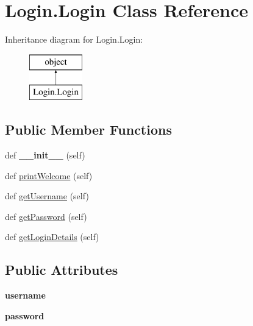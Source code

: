 \hypertarget{class_login_1_1_login}{}\section{Login.\+Login Class Reference}
\label{class_login_1_1_login}
Inheritance diagram for Login.\+Login\+:\begin{figure}[H]
\begin{center}
\leavevmode
\includegraphics[height=2.000000cm]{class_login_1_1_login}
\end{center}
\end{figure}
\subsection*{Public Member Functions}
\begin{DoxyCompactItemize}
\item 
\hypertarget{class_login_1_1_login_a74dca9aa3c7fc04833737bed7ba4f48d}{}\label{class_login_1_1_login_a74dca9aa3c7fc04833737bed7ba4f48d} 
def {\bfseries \+\_\+\+\_\+init\+\_\+\+\_\+} (self)
\item 
def \hyperlink{class_login_1_1_login_a77f5c43218a5b49e663f72e02324b8ef}{print\+Welcome} (self)
\item 
def \hyperlink{class_login_1_1_login_a21cb771ec1b1d2d7aa17ca541465200b}{get\+Username} (self)
\item 
def \hyperlink{class_login_1_1_login_a61681c3cd7aae627d5a41324ba0f9d76}{get\+Password} (self)
\item 
def \hyperlink{class_login_1_1_login_a4ccae6933e82c3ff7d7cb257427064e2}{get\+Login\+Details} (self)
\end{DoxyCompactItemize}
\subsection*{Public Attributes}
\begin{DoxyCompactItemize}
\item 
\hypertarget{class_login_1_1_login_a17601e10f372715b555b073bcb7cf407}{}\label{class_login_1_1_login_a17601e10f372715b555b073bcb7cf407} 
{\bfseries username}
\item 
\hypertarget{class_login_1_1_login_a02c4b71b842db75f807a06fd79549bcc}{}\label{class_login_1_1_login_a02c4b71b842db75f807a06fd79549bcc} 
{\bfseries password}
\end{DoxyCompactItemize}


